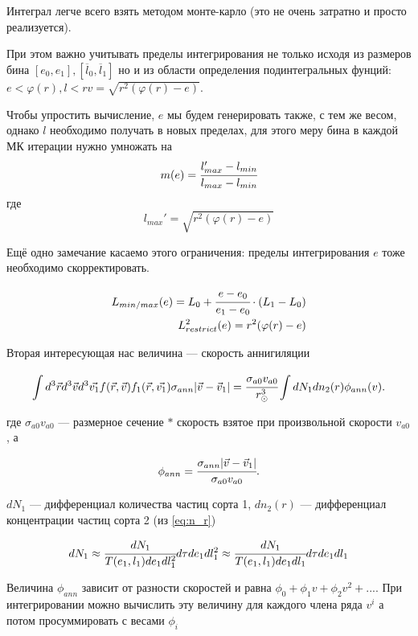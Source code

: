 \begin{enumerate}
	 		
	 	Интеграл легче всего взять методом монте-карло (это не очень затратно и просто реализуется).
	 	
	 	При этом важно учитывать пределы интегрирования не только исходя из размеров бина $[e_0,e_1],[\overline{l}_0,\overline{l}_1]$ но и из области определения подинтегральных фунций: $e<\varphi(r), l<rv = \sqrt{r^2(\varphi(r)-e)}$.
	 	
	 	Чтобы упростить вычисление, $e$ мы будем генерировать также, с тем же весом, однако $l$ необходимо получать в новых пределах, для этого меру бина в каждой МК итерации нужно умножать на 
	 	\begin{equation*}
	 		m(e) = \cfrac{l_{max}'-l_{min}}
	 		{l_{max}-l_{min}}
	 	\end{equation*}
	 	где 
	 	\begin{equation*}
	 		l_{max}' = \sqrt{r^2(\varphi(r)-e)}
	 	\end{equation*}
	 	
	 	Ещё одно замечание касаемо этого ограничения: пределы интегрирования $e$ тоже необходимо скорректировать.
	 	
	 	\begin{eqnarray}
	 		L_{min/max}(e) = L_0 + \cfrac{e-e_0}{e_1-e_0} \cdot (L_1-L_0)
	 		\\
	 		L^2_{restrict}(e) = r^2(\varphi(r)-e)	 		
	 	\end{eqnarray}
	 	
	 \end{enumerate}
	 
	 Вторая интересующая нас величина --- скорость аннигиляции
	 
	 \begin{equation}
	 	\label{eq:ann_st}
	 	\int{d^3\vec{r} d^3\vec{v}  d^3\vec{v_1} 
	 		f(\vec{r},\vec{v})f_1(\vec{r},\vec{v_1}) \sigma_{ann} 
	 		|\vec{v}-\vec{v}_1|} = \cfrac{\sigma_{a0}v_{a0}}{r_{\odot}^3} \int{dN_1 dn_2(r) \phi_{ann}(v) }.
	 \end{equation}
	 
	 где $\sigma_{a0}v_{a0}$ --- размерное сечение $*$ скорость взятое при произвольной скорости $v_{a0}$, а 
	 
	\begin{equation}
		\phi_{ann} = \cfrac{\sigma_{ann} |\vec{v}-\vec{v}_1| }{\sigma_{a0}  v_{a0}}.
	\end{equation}
	
	$dN_1$ --- дифференциал количества частиц сорта 1, $dn_2(r)$ --- дифференциал концентрации частиц сорта 2  (из \ref{eq:n_r})
	
	\begin{equation}
		dN_1 \approx \cfrac{dN_1}{T(e_1,l_1)de_1 dl_1^2} d\tau de_1 dl_1^2 \approx \cfrac{dN_1}{T(e_1,l_1)de_1 dl_1} d\tau de_1 dl_1 
	\end{equation}
	
	Величина $\phi_{ann}$ зависит от разности скоростей и равна $\phi_0 + \phi_1 v+ \phi_2 v^2 +...$. При интегрировании можно вычислить эту величину для каждого члена ряда $v^i$ а потом просуммировать с весами $\phi_i$
	
	
	
